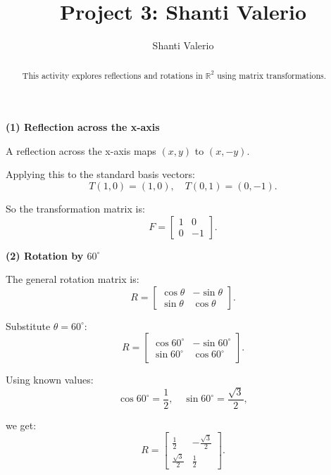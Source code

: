 \documentclass{ximera}
\title{Project 3: Shanti Valerio}
\author{Shanti Valerio}
\begin{document}
\begin{abstract}
    This activity explores reflections and rotations in $\mathbb{R}^2$ using matrix transformations.
\end{abstract}
\maketitle

\begin{exercise}
\textbf{(1) Reflection across the x-axis}

A reflection across the x-axis maps $(x, y)$ to $(x, -y)$.

Applying this to the standard basis vectors:
\[
T(1,0) = (1,0), \quad T(0,1) = (0,-1).
\]

So the transformation matrix is:
\[
F = \begin{bmatrix} 1 & 0 \\ 0 & -1 \end{bmatrix}.
\]

\end{exercise}

\begin{exercise}
\textbf{(2) Rotation by $60^\circ$}

The general rotation matrix is:
\[
R = \begin{bmatrix} \cos \theta & -\sin \theta \\ \sin \theta & \cos \theta \end{bmatrix}.
\]

Substitute $\theta = 60^\circ$:
\[
R = \begin{bmatrix} \cos 60^\circ & -\sin 60^\circ \\ \sin 60^\circ & \cos 60^\circ \end{bmatrix}.
\]

Using known values:
\[
\cos 60^\circ = \frac{1}{2}, \quad \sin 60^\circ = \frac{\sqrt{3}}{2},
\]

we get:
\[
R = \begin{bmatrix} \frac{1}{2} & -\frac{\sqrt{3}}{2} \\[6pt] \frac{\sqrt{3}}{2} & \frac{1}{2} \end{bmatrix}.
\]

\end{exercise}
\end{document}
